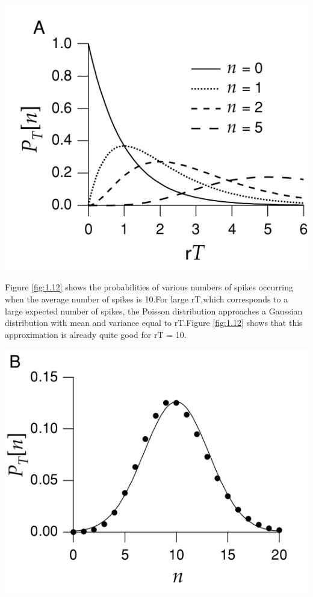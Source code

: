 \begin{center}
        \includegraphics[scale = 0.2]{png/Figure1-11-A}\\        
        \label{fig:1.11}            
\end{center}

\begin{exm}
    Figure \ref{fig:1.12} shows the probabilities of various numbers of spikes occurring when the average number of spikes is 10.For large rT,which corresponds to a large expected number of spikes, the Poisson distribution approaches a Gaussian distribution with mean and variance equal to rT.Figure \ref{fig:1.12} shows that this approximation is already quite good for rT = 10.
\end{exm}    

\begin{center}
    \includegraphics[scale = 0.2]{png/Figure1-11-B}\\    
    \label{fig:1.12}        
\end{center}

